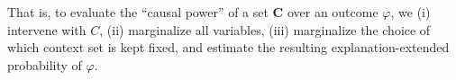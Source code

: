 \documentclass[anon,12pt]{clear2025} %
\begin{document}
\noindent That is, to evaluate the ``causal power'' of a set $\mathbf{C}$  over an outcome $\varphi$, we (i) intervene with $C$, (ii) marginalize all variables, (iii) marginalize the choice of which context set is kept fixed, and estimate the resulting explanation-extended probability of $\varphi$.









\end{document}
